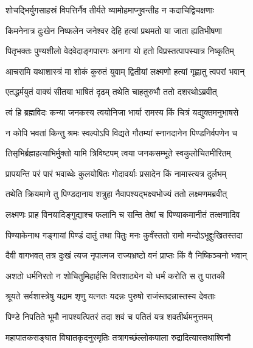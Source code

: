 \twolineshloka
{शोचद्भिर्युगसाहस्रं विपत्तिर्नैव तीर्यते}
{व्यामोहमाप्नुवन्तीह न कदाचिद्विचक्षणाः} %

\twolineshloka
{किमनेनात्र दुःखेन निष्फलेन जनेश्वर}
{देहि हत्यां प्रथमतो या जाता ह्यतिभीषणा} %

\twolineshloka
{पितृभक्तः पुण्यशीलो वेदवेदाङ्गपारगः}
{अनागा यो हतो विप्रस्तत्पापस्यात्र निष्कृतिम्} %

\twolineshloka
{आचरामि यथाशास्त्रं मा शोकं कुरुतं युवाम्}
{द्वितीयां लक्ष्मणो हत्यां गृह्णातु त्वपरां भवान्} %



\twolineshloka
{एतद्धर्मयुतं वाक्यं सीतया भाषितं दृढम्}
{तथेति चाहतुरुभौ ततो दशरथोऽब्रवीत्} %



\twolineshloka
{त्वं हि ब्रह्मविदः कन्या जनकस्य त्वयोनिजा}
{भार्या रामस्य किं चित्रं यद्युक्तमनुभाषसे} %

\twolineshloka
{न कोपि भवतां किन्तु श्रमः स्वल्पोऽपि विद्यते}
{गौतम्यां स्नानदानेन पिण्डनिर्वपणेन च} %

\twolineshloka
{तिसृभिर्ब्रह्महत्याभिर्मुक्तो यामि त्रिविष्टपम्}
{त्वया जनकसम्भूते स्वकुलोचितमीरितम्} %

\twolineshloka
{प्रापयन्ति परं पारं भवाब्धेः कुलयोषितः}
{गोदावर्याः प्रसादेन किं नामास्त्यत्र दुर्लभम्} %



\twolineshloka
{तथेति क्रियमाणे तु पिण्डदानाय शत्रुहा}
{नैवापश्यद्भक्ष्यभोज्यं ततो लक्ष्मणमब्रवीत्} %

\twolineshloka
{लक्ष्मणः प्राह विनयादिङ्गुद्याश्च फलानि च}
{सन्ति तेषां च पिण्याकमानीतं तत्क्षणादिव} %

\twolineshloka
{पिण्याकेनाथ गङ्गायां पिण्डं दातुं तथा पितुः}
{मनः कुर्वंस्ततो रामो मन्दोऽभूद्दुःखितस्तदा} %

\twolineshloka
{दैवी वागभवत् तत्र दुःखं त्यज नृपात्मज}
{राज्यभ्रष्टो वनं प्राप्तः किं वै निष्किञ्चनो भवान्} %

\twolineshloka
{अशठो धर्मनिरतो न शोचितुमिहार्हसि}
{वित्तशाठ्येन यो धर्मं करोति स तु पातकी} %

\twolineshloka
{श्रूयते सर्वशास्त्रेषु यद्राम शृणु यत्नतः}
{यदन्नः पुरुषो राजंस्तदन्नास्तस्य देवताः} %

\twolineshloka
{पिण्डे निपतिते भूमौ नापश्यत्पितरं तदा}
{शवं च पतितं यत्र शवतीर्थमनुत्तमम्} %

\twolineshloka
{महापातकसङ्घात विघातकृदनुस्मृतिः}
{तत्रागच्छंल्लोकपाला रुद्रादित्यास्तथाश्विनौ} %

